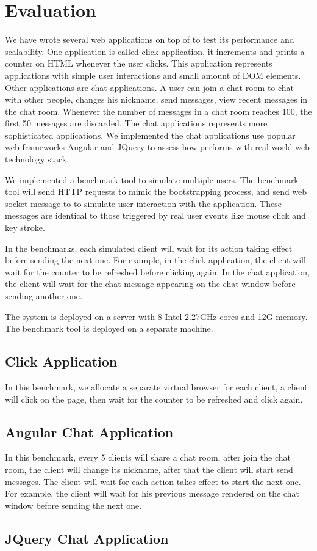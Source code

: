 \section{Evaluation}
\label{sec:eval}
We have wrote several web applications on top of \cb{} to test its
performance and scalability.
One application is called click application,
it increments and prints a counter on HTML whenever the user clicks.
This application represents applications with simple user interactions and small amount of DOM elements.
Other applications are chat applications.
A user can join a chat room to chat with other people,
changes his nickname, send messages, view recent messages in the chat room.
Whenever the number of messages in a chat room reaches 100, the first 50 messages
are discarded.
The chat applications represents more sophisticated applications.
We implemented the chat applications use popular web frameworks Angular and JQuery
to assess how \cb{} performs with real world web technology stack.

We implemented a benchmark tool to simulate multiple users.
The benchmark tool will send HTTP requests to mimic the bootstrapping process,
and send web socket message to \cb{} to simulate user interaction with the application.
These messages are identical to those triggered by real user events like mouse click and key stroke.

In the benchmarks, each simulated client will wait for its action taking effect before 
sending the next one.
For example, in the click application, the client will wait for the counter
to be refreshed before clicking again.
In the chat application, the client will wait for
the chat message appearing on the chat window before sending another one.

The \cb{} system is deployed on a server with 8 Intel 2.27GHz cores and 12G memory.
The benchmark tool is deployed on a separate machine.

\subsection{Click Application}
In this benchmark,
we allocate a separate virtual browser for each client,
a client will click on the page, then wait for the counter to be refreshed and click again.

\clickthroughput{}
\clicklatency{}

\clickwaitthroughput{}
\clickwaitlatency{}

\subsection{Angular Chat Application}
In this benchmark,
every 5 clients will share a chat room, 
after join the chat room, the client will change its nickname,
after that the client will start send messages.
The client will wait for each action takes effect to start the next one.
For example, the client will wait for his previous message rendered on the chat window before
sending the next one.


\subsection{JQuery Chat Application}

\jquerychatlatency{}
